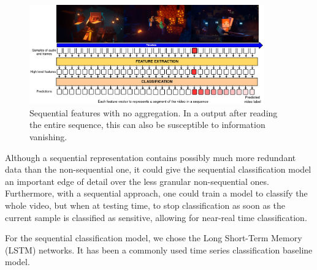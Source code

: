 \begin{figure}[!ht]
    \centering
    \includegraphics[width=0.9\textwidth]{img/model-sequence.png}
    \caption{Sequential features with no aggregation. In a output after reading the entire sequence, this can also be susceptible to information vanishing.}
    \label{fig:model-sequence}
    \vspace{-1em}
\end{figure}
Although a sequential representation contains possibly much more redundant data than the non-sequential one, it could give the sequential classification model an important edge of detail over the less granular non-sequential ones. Furthermore, with a sequential approach, one could train a model to classify the whole video, but when at testing time, to stop classification as soon as the current sample is classified as sensitive, allowing for near-real time classification.

For the sequential classification model, we chose the Long Short-Term Memory (LSTM)\cite{hochreiter1997long} networks.
It has been a commonly used time series classification baseline model. %

